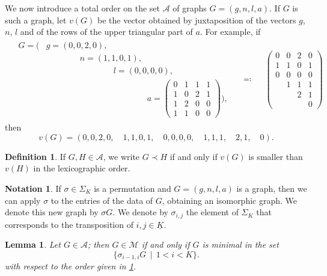 \documentclass{amsart}
\theoremstyle{plain}
\newtheorem{lemma}[theorem]{Lemma}
\theoremstyle{definition}
\newtheorem{definition}[theorem]{Definition}
\newtheorem{notation}[theorem]{Notation}
\newcommand{\ubar}[1]{\underline{#1}}
\newcommand{\psm}[1]{\left(\begin{smallmatrix}#1\end{smallmatrix}\right)}
\begin{document}
We now introduce a total order on the set $\mathcal{A}$ of graphs $G = (g,n,l,a)$. If $G$ is such a graph, let $v(G)$ be the vector obtained by
juxtaposition of the vectors $g$, $n$, $l$ and of the rows of the
upper triangular part of $a$. For example, if
\begin{align*}
  &\begin{aligned}
    G = \biggl(&g = (0,0,2,0),\\
    &\qquad \qquad n = (1,1,0,1),\\[6pt]
    &\qquad \qquad \qquad \qquad l = (0,0,0,0),\\
    &\qquad \qquad \qquad \qquad \qquad \qquad a = \psm{ 0 & 1 & 1 &
      1\\ 1 & 0 & 2 & 1\\ 1 & 2 & 0 & 0 \\ 1 & 1 & 0 & 0 }
    \biggr)\text{,}
  \end{aligned}
  && \eqqcolon &&\psm{ 0 & 0 & 2 & 0\\ 1 & 1 & 0 & 1\\ 0 & 0 & 0 & 0\\
    & 1 & 1 & 1\\ && 2 & 1\\ &&& 0 }
\end{align*}
then
\[
v(G) = (0, 0, 2, 0,\quad 1, 1, 0, 1,\quad 0, 0, 0, 0,\quad 1, 1,
1,\quad 2, 1,\quad 0)\text{.}
\]

\begin{definition} \label{def:order} If $G, H \in \mathcal{A}$, we
  write $G \prec H$ if and only if $v(G)$ is smaller than $v(H)$ in
  the lexicographic order.
\end{definition}

\begin{notation}
  If $\sigma \in \Sigma_K$ is a permutation and $G = (g, n, l, a)$ is
  a graph, then we can apply $\sigma$ to the entries of the data of
  $G$, obtaining an isomorphic graph. We denote this new graph by
  $\sigma G$. We denote by $\sigma_{i,j}$ the element of $\Sigma_K$ that corresponds to the transposition of $i, j \in \ubar{K}$.
\end{notation}

\begin{lemma}\label{lemma:char2}
  Let $G \in \mathcal{A}$; then $G \in \mathcal{M}$ if and only if $G$
  is minimal in the set
  \[
  \bigl\{ \sigma_{i-1,i} G \,\mid\, 1<i<K \bigr\}\text{.}
  \]
  with respect to the order given in \ref{def:order}.
\end{lemma}
\end{document}
